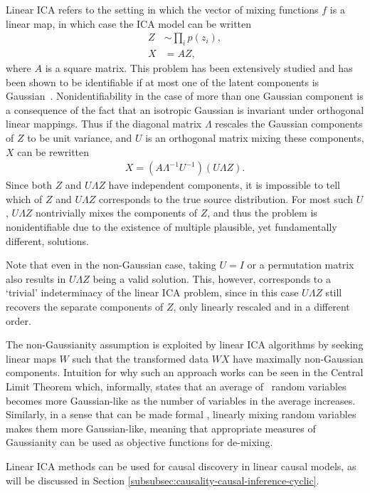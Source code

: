 Linear ICA refers to the setting in which the vector of mixing functions $f$ is a linear map, 
in which case the ICA model can be written
%
\begin{align*}
Z &\sim \prod_i p(z_i), \\
X &= AZ,
\end{align*}
%
where $A$ is a square matrix.
This problem has been extensively studied and has been shown to be identifiable if at most one of the latent components is Gaussian~\citep{darmois1953analyse, skitovich1954linear, comon1994independent}.
Nonidentifiability in the case of more than one Gaussian component is a consequence of the fact that an isotropic Gaussian is invariant under orthogonal linear mappings.
Thus if the diagonal matrix $\Lambda$ rescales the Gaussian components of $Z$ to be unit variance, and $U$ is an orthogonal matrix mixing these components, $X$ can be rewritten
%
\begin{align*}
X = \left(A\Lambda^{-1}U^{-1} \right) \left(U\Lambda Z\right).
\end{align*}
%
Since both $Z$ and $U\Lambda Z$ have independent components, it is impossible to tell which of $Z$ and ${U}{\Lambda} Z$ corresponds to the true source distribution.
For most such $U$, $U\Lambda Z$ nontrivially mixes the components of $Z$, and thus the problem is nonidentifiable due to the existence of multiple plausible, yet fundamentally different, solutions.

Note that even in the non-Gaussian case, taking $U=I$ or a permutation matrix also results in $U\Lambda Z$ being a valid solution. 
This, however, corresponds to a `trivial' indeterminacy of the linear ICA problem, since in this case $U\Lambda Z$ still recovers the separate components of $Z$, only linearly rescaled and in a different order.

The non-Gaussianity assumption is exploited by linear ICA algorithms by seeking linear maps $W$ such that the transformed data ${W}X$ have maximally non-Gaussian components.
Intuition for why such an approach works can be seen in the Central Limit Theorem which, informally, states that an average of \iid~random variables becomes more Gaussian-like as the number of variables in the average increases. 
Similarly, in a sense that can be made formal \citep{hyvarinen2000independent}, linearly mixing random variables makes them more Gaussian-like, meaning that appropriate measures of Gaussianity can be used as objective functions for de-mixing.

Linear ICA methods can be used for causal discovery in linear causal models, as will be discussed in Section \ref{subsubsec:causality-causal-inference-cyclic}.





